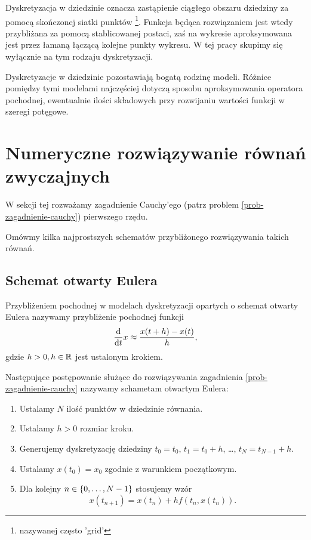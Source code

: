 \documentclass[12pt,a4paper]{report}
\begin{document}
Dyskretyzacja w dziedzinie oznacza zastąpienie ciągłego obszaru dziedziny za pomocą skończonej siatki punktów \footnote{nazywanej często 'grid'}. Funkcja będąca rozwiązaniem jest wtedy przybliżana za pomocą stablicowanej postaci, zaś na wykresie aproksymowana jest przez łamaną łączącą kolejne punkty wykresu. W tej pracy skupimy się wyłącznie na tym rodzaju dyskretyzacji. 

Dyskretyzacje w dziedzinie pozostawiają bogatą rodzinę modeli. Różnice pomiędzy tymi modelami najczęściej dotyczą sposobu aproksymowania operatora pochodnej, ewentualnie ilości składowych przy rozwijaniu wartości funkcji w szeregi potęgowe. 


\section{Numeryczne rozwiązywanie równań zwyczajnych}

W sekcji tej rozważamy zagadnienie Cauchy'ego (patrz problem \ref{prob-zagadnienie-cauchy}) pierwszego rzędu. 



Omówmy kilka najprostszych schematów przybliżonego rozwiązywania takich równań.

\subsection{Schemat otwarty Eulera}

\begin{definition}
Przybliżeniem pochodnej w modelach dyskretyzacji opartych o schemat otwarty Eulera nazywamy przybliżenie pochodnej funkcji
$$
\frac{\mathrm{d} {} }{\mathrm{d}{t}}x \approx \frac{x(t+h) - x(t)}{h},
$$
gdzie $h >0, h \in \mathbb{R} $ jest ustalonym krokiem. 
\end{definition}

\begin{algorithm}
Następujące postępowanie służące do rozwiązywania zagadnienia \ref{prob-zagadnienie-cauchy} nazywamy schametam otwartym Eulera:
\begin{enumerate}
\item Ustalamy $N$ ilość punktów w dziedzinie równania. 
\item Ustalamy $h>0$ rozmiar kroku.
\item Generujemy dyskretyzację dziedziny $t_0 = t_0$, $t_1 = t_0 + h$, \ldots, $t_N = t_{N-1}+h$. 
\item Ustalamy $x(t_0) = x_0$ zgodnie z warunkiem początkowym.
\item Dla kolejny $n \in \left\lbrace {0, \ldots, N-1} \right\rbrace$ stosujemy wzór
$$
x(t_{n+1}) = x(t_n) + h f(t_n, x(t_n)).
$$
\end{enumerate}
\end{algorithm}
\end{document}
